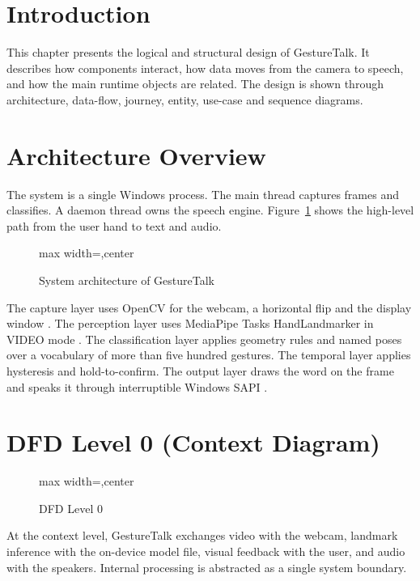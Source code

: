 \section{Introduction}
This chapter presents the logical and structural design of GestureTalk. It describes how components interact, how data moves from the camera to speech, and how the main runtime objects are related. The design is shown through architecture, data-flow, journey, entity, use-case and sequence diagrams.

\section{Architecture Overview}
The system is a single Windows process. The main thread captures frames and classifies. A daemon thread owns the speech engine. Figure~\ref{fig:arch} shows the high-level path from the user hand to text and audio.

\begin{figure}[H]
\centering
\begin{adjustbox}{max width=\textwidth,center}

\end{adjustbox}
\caption{System architecture of GestureTalk}
\label{fig:arch}
\end{figure}

The capture layer uses OpenCV for the webcam, a horizontal flip and the display window \cite{opencv}. The perception layer uses MediaPipe Tasks HandLandmarker in VIDEO mode \cite{mediapipehl}. The classification layer applies geometry rules and named poses over a vocabulary of more than five hundred gestures. The temporal layer applies hysteresis and hold-to-confirm. The output layer draws the word on the frame and speaks it through interruptible Windows SAPI \cite{sapi}.

\section{DFD Level 0 (Context Diagram)}
\begin{figure}[H]
\centering
\begin{adjustbox}{max width=\textwidth,center}

\end{adjustbox}
\caption{DFD Level 0}
\label{fig:dfd0}
\end{figure}

At the context level, GestureTalk exchanges video with the webcam, landmark inference with the on-device model file, visual feedback with the user, and audio with the speakers. Internal processing is abstracted as a single system boundary.

